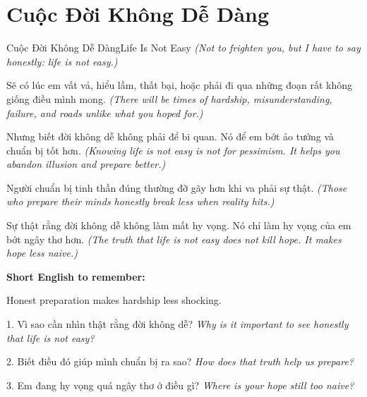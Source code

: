 \section{Cuộc Đời Không Dễ Dàng}
\begin{truyen}{Cuộc Đời Không Dễ Dàng}{Life Is Not Easy}
\textit{(Not to frighten you, but I have to say honestly: life is not easy.)}

Sẽ có lúc em vất vả, hiểu lầm, thất bại, hoặc phải đi qua những đoạn rất không giống điều mình mong.
\textit{(There will be times of hardship, misunderstanding, failure, and roads unlike what you hoped for.)}

Nhưng biết đời không dễ không phải để bi quan. Nó để em bớt ảo tưởng và chuẩn bị tốt hơn.
\textit{(Knowing life is not easy is not for pessimism. It helps you abandon illusion and prepare better.)}

Người chuẩn bị tinh thần đúng thường đỡ gãy hơn khi va phải sự thật.
\textit{(Those who prepare their minds honestly break less when reality hits.)}
\end{truyen}

\begin{baihoc}
Sự thật rằng đời không dễ không làm mất hy vọng. Nó chỉ làm hy vọng của em bớt ngây thơ hơn.
\textit{(The truth that life is not easy does not kill hope. It makes hope less naive.)}
\end{baihoc}

\begin{ghinhoanh}
\textbf{Short English to remember:}

Honest preparation makes hardship less shocking.

\end{ghinhoanh}

\begin{tuhocnhanh}
1. Vì sao cần nhìn thật rằng đời không dễ? \textit{Why is it important to see honestly that life is not easy?}

2. Biết điều đó giúp mình chuẩn bị ra sao? \textit{How does that truth help us prepare?}

3. Em đang hy vọng quá ngây thơ ở điều gì? \textit{Where is your hope still too naive?}
\end{tuhocnhanh}
\ngancach

